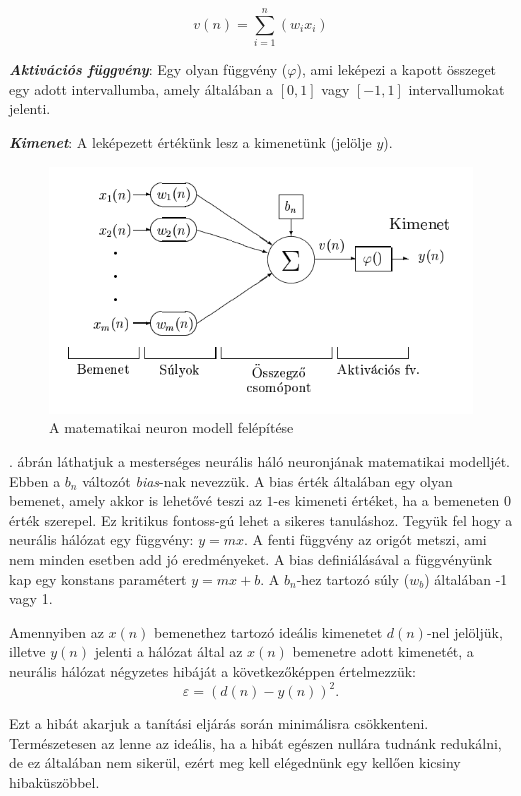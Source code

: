 $$
v(n) = \sum_{i=1}^{n}(w_ix_i)
$$

\textit{\textbf{Aktivációs függvény}}: Egy olyan függvény ($\varphi$), ami leképezi a kapott összeget egy adott intervallumba, amely általában a $[0, 1]$ vagy $[-1, 1]$ intervallumokat jelenti.

\textbf{\textit{Kimenet}}: A leképezett értékünk lesz a kimenetünk (jelölje $y$).

\begin{figure}[h]
	\centering
	\includegraphics[scale=0.6]{images/ANNParts.png}
	\caption{A matematikai neuron modell felépítése\cite{neuralis77}}
	\label{fig:ANNParts}
\end{figure}

. ábrán láthatjuk a mesterséges neurális háló neuronjának matematikai modelljét. Ebben a $b_n$ változót \textit{bias}-nak nevezzük. A bias érték általában egy olyan bemenet, amely akkor is lehetővé teszi az $1$-es kimeneti értéket, ha a bemeneten $0$ érték szerepel. Ez kritikus fontoss-gú lehet a sikeres tanuláshoz. Tegyük fel hogy a neurális hálózat egy függvény: $y = mx$. A fenti függvény az origót metszi, ami nem minden esetben add jó eredményeket. A bias definiálásával a függvényünk kap egy konstans paramétert $y = mx + b$. A $b_n$-hez tartozó súly ($w_b$) általában -1 vagy 1.

Amennyiben az $x(n)$ bemenethez tartozó ideális kimenetet $d(n)$-nel jelöljük, illetve $y(n)$ jelenti a hálózat által az $x(n)$ bemenetre adott kimenetét, a neurális hálózat négyzetes hibáját a következőképpen értelmezzük:
$$
\varepsilon = (d(n) - y(n))^2.
$$

Ezt a hibát akarjuk a tanítási eljárás során minimálisra csökkenteni. Természetesen az lenne az ideális, ha a hibát egészen nullára tudnánk redukálni, de ez általában nem sikerül, ezért meg kell elégednünk egy kellően kicsiny hibaküszöbbel.


